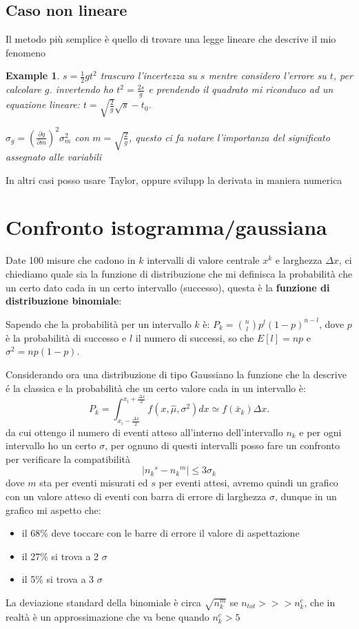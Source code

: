 \documentclass{article}
\newtheorem{example}{Example}
\begin{document}
\subsection{Caso non lineare}
Il metodo più semplice è quello di trovare una legge lineare che descrive il mio fenomeno
\begin{example}
    $s= \frac{1}{2} g t^2 $
    trascuro l'incertezza su $s$ mentre considero l'errore su $t$, per calcolare $g$. 
    invertendo ho $t^2= \frac{2s}{g}$ e prendendo il quadrato mi riconduco ad un equazione lineare: $ t= \sqrt{\frac{2}{g}} \sqrt{s} - t_0$.

    $\sigma_g = \left(\frac{\partial g}{\partial m}\right)^2 \sigma_m^2$ con $m=\sqrt{\frac{2}{g}}$, questo ci fa notare l'importanza del significato assegnato alle variabili
\end{example}
In altri casi posso usare Taylor, oppure svilupp la derivata in maniera numerica





\section{Confronto istogramma/gaussiana}
Date 100 misure che cadono in $k$ intervalli di valore centrale $x^k$ e larghezza $\Delta x$, ci chiediamo quale sia la funzione di distribuzione che mi definisca la probabilità che un certo dato cada in un
certo intervallo (successo), questa è la \textbf{funzione di distribuzione binomiale}:

Sapendo che la probabilità per un intervallo $k$ è: $P_k= \binom{n}{l}p^l(1-p)^{n-l}$, dove $p$ è la probabilità di successo e $l$ il numero di successi, so che $E[l]=np$ e  $\sigma^2= np(1-p)$.

Considerando ora una distribuzione di tipo Gaussiano la funzione che la descrive é la classica e la probabilità che un certo valore cada in un intervallo è:
\[
P_k=\int_{x_i -\frac{\Delta x}{2}}^{x_i + \frac{\Delta x}{2}} f(x, \hat{\mu}, \sigma^2) dx \simeq f(\bar{x}_k) \Delta x. 
\]
da cui ottengo il numero di eventi atteso all'interno dell'intervallo $n_k$ e per ogni intervallo ho un certo $\sigma$, per ognuno di questi intervalli posso fare un confronto per verificare la compatibilità
\begin{equation*}
\left| {n_k}^s-{n_k}^m \right| \leq 3 \sigma_k
\end{equation*}
dove $m$ sta per eventi misurati ed $s$ per eventi attesi, avremo quindi un grafico con un valore atteso di eventi con barra di errore di larghezza $\sigma$, dunque in un grafico mi aspetto che:
\begin{itemize}
\item il 68\% deve toccare con le barre di errore il valore di aspettazione
\item il 27\% si trova a 2 $\sigma$
\item il 5\% si trova a 3 $\sigma$
\end{itemize}
La deviazione standard della binomiale è circa $\sqrt{n_k^m}$ se $n_{tot}>>>n_k^c$, che in realtà è un approssimazione che va bene quando $n_k^c > 5$
\end{document}
